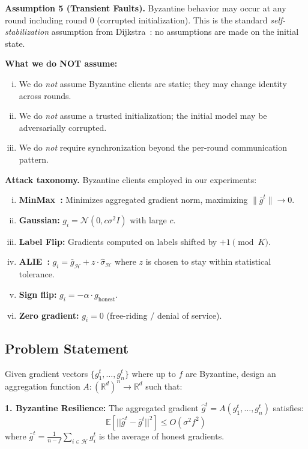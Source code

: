 \documentclass[runningheads]{llncs}
\begin{document}
\noindent\textbf{Assumption 5 (Transient Faults).}
Byzantine behavior may occur at any round including round 0 (corrupted initialization). This is the standard \emph{self-stabilization} assumption from Dijkstra~\cite{dijkstra_self_stab}: no assumptions are made on the initial state.

\smallskip
\noindent\textbf{What we do NOT assume:}
\begin{enumerate}[(i)]
\item We do \emph{not} assume Byzantine clients are static; they may change identity across rounds.
\item We do \emph{not} assume a trusted initialization; the initial model may be adversarially corrupted.
\item We do \emph{not} require synchronization beyond the per-round communication pattern.
\end{enumerate}

\smallskip
\noindent\textbf{Attack taxonomy.} Byzantine clients employed in our experiments:
\begin{enumerate}[(i)]
\item \textbf{MinMax~\cite{fl_poisoning}:} Minimizes aggregated gradient norm, maximizing $\|\bar{g}^t\| \to 0$.
\item \textbf{Gaussian:} $g_i = \mathcal{N}(0, c\sigma^2 I)$ with large $c$.
\item \textbf{Label Flip:} Gradients computed on labels shifted by $+1 \pmod{K}$.
\item \textbf{ALIE~\cite{alie_attack}:} $g_i = \bar{g}_{\mathcal{H}} + z \cdot \hat{\sigma}_{\mathcal{H}}$ where $z$ is chosen to stay within statistical tolerance.
\item \textbf{Sign flip:} $g_i = -\alpha \cdot g_{\text{honest}}$.
\item \textbf{Zero gradient:} $g_i = 0$ (free-riding / denial of service).
\end{enumerate}

\subsection{Problem Statement}

Given gradient vectors $\{g_1^t, \ldots, g_n^t\}$ where up to $f$ are Byzantine, design an aggregation function $A: (\mathbb{R}^d)^n \to \mathbb{R}^d$ such that:

\textbf{1. Byzantine Resilience:} The aggregated gradient $\hat{g}^t = A(g_1^t, \ldots, g_n^t)$ satisfies:
\begin{equation}
\mathbb{E}[||\hat{g}^t - \bar{g}^t||^2] \leq O(\sigma^2 f^2)
\end{equation}
where $\bar{g}^t = \frac{1}{n-f} \sum_{i \in \mathcal{H}} g_i^t$ is the average of honest gradients.
\end{document}
